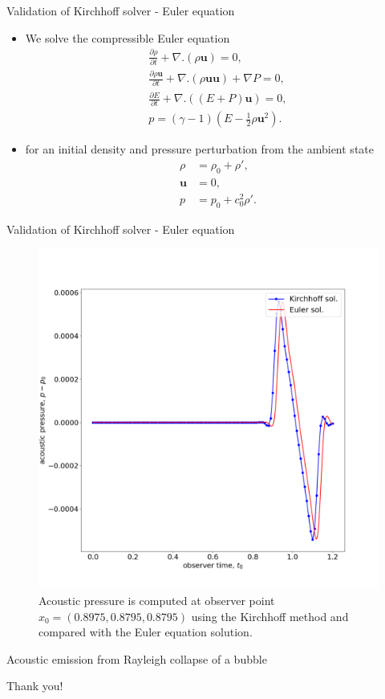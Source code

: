 \documentclass[10pt, aspectratio=169]{beamer}
\begin{document}
\begin{frame}{Validation of Kirchhoff solver - Euler equation}
	\begin{itemize}
		\item We solve the compressible Euler equation
		\begin{align}
			\frac{\partial \rho}{\partial t} + \nabla . (\rho \mathbf{u}) = 0,\\
			\frac{\partial \rho \mathbf{u}}{\partial t} + \nabla . (\rho \mathbf{u} \mathbf{u}) + \nabla P	 = 0,\\
			\frac{\partial E}{\partial t} + \nabla . ((E + P) \mathbf{u}) = 0,\\
			p = (\gamma - 1)(E - \frac{1}{2}\rho \mathbf{u}^{2}).
		\end{align}
		\item  for an initial density and pressure perturbation from the ambient state
		\begin{align*}
			\rho &= \rho_{0} + \rho',\\
			\mathbf{u}    &= 0,\\
			p    &= p_{0} + c_{0}^{2}\rho'. 
		\end{align*}
	\end{itemize}
\end{frame}
\begin{frame}{Validation of Kirchhoff solver - Euler equation}
	\begin{figure}
		\centering
		\includegraphics[scale=0.17]{images/euler.png}
		\caption{Acoustic pressure is computed at observer point $x_{0} = (0.8975, 0.8795, 0.8795)$ using the Kirchhoff method and compared with the Euler equation solution.}
	\end{figure}
\end{frame}


\begin{frame}{Acoustic emission from Rayleigh collapse of a bubble}
	
\end{frame}




\begin{frame}[standout]
	Thank you!
\end{frame}
\end{document}
